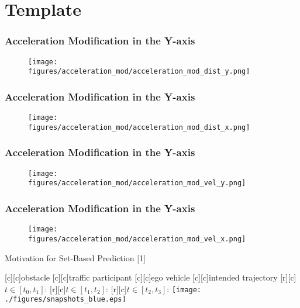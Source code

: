 
\section{Template}

\begin{frame}
  \frametitle{Acceleration Modification in the Y-axis}
  \begin{figure}
    \centering
    \texttt{[image: figures/acceleration\_mod/acceleration\_mod\_dist\_y.png]}
  \end{figure}
\end{frame}


\begin{frame}
  \frametitle{Acceleration Modification in the Y-axis}
  \begin{figure}
    \centering
    \texttt{[image: figures/acceleration\_mod/acceleration\_mod\_dist\_x.png]}
  \end{figure}
\end{frame}


\begin{frame}
  \frametitle{Acceleration Modification in the Y-axis}
  \begin{figure}
    \centering
    \texttt{[image: figures/acceleration\_mod/acceleration\_mod\_vel\_y.png]}
  \end{figure}
\end{frame}


\begin{frame}
  \frametitle{Acceleration Modification in the Y-axis}
  \begin{figure}
    \centering
    \texttt{[image: figures/acceleration\_mod/acceleration\_mod\_vel\_x.png]}
  \end{figure}
\end{frame}




\begin{frame}{Motivation for Set-Based Prediction $[$1$]$}

	\centering	
	\footnotesize
      [c][c]{obstacle}						
      [c][c]{traffic participant}
      [c][c]{ego vehicle}
      [c][c]{intended trajectory}      
      [r][c]{$t \in [t_0, t_1]$:}
      [r][c]{$t \in [t_1, t_2]$:}
      [r][c]{$t \in [t_2, t_3]$:}
      \texttt{[image: ./figures/snapshots\_blue.eps]}
\end{frame}


